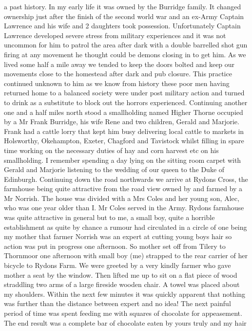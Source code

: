 a past history. In my early life it was owned by the Burridge family. It
changed ownership just after the finish of the second world war and an ex-Army
Captain Lawrence and his wife and 2 daughters took possession. Unfortunately
Captain Lawrence developed severe stress from military experiences and it was
not uncommon for him to patrol the area after dark with a double barrelled shot
gun firing at any movement he thought could be demons closing in to get him. As
we lived some half a mile away we tended to keep the doors bolted and keep our
movements close to the homestead after dark and pub closure. This practice
continued unknown to him as we know from history these poor men having returned
home to a balanced society were under post military action and turned to drink
as a substitute to block out the horrors experienced. Continuing another one
and a half miles north stood a smallholding named Higher Thorne occupied by a
Mr Frank Burridge, his wife Rene and two children, Gerald and Marjorie. Frank
had a cattle lorry that kept him busy delivering local cattle to markets in
Holsworthy, Okehampton, Exeter, Chagford and Tavistock whilst filling in spare
time working on the necessary duties of hay and corn harvest etc on his
smallholding. I remember spending a day lying on the sitting room carpet with
Gerald and Marjorie listening to the wedding of our queen to the Duke of
Edinburgh. Continuing down the road northwards we arrive at Rydons Cross, the
farmhouse being quite attractive from the road view owned by and farmed by a Mr
Norrish. The house was divided  with a Mrs Coles and her young son, Alec, who
was one year older than I. Mr Coles served in the Army. Rydons farmhouse was
quite attractive in general but to me, a small boy, quite a horrible
establishment as quite by chance a rumour had circulated in a circle of one
being my mother that farmer Norrish was an expert at cutting young boys hair so
action was put in progress one afternoon. So mother set off from Tilery to
Thornmoor one afternoon with small boy (me) strapped to the rear carrier of her
bicycle to Rydons Farm. We were greeted by a very kindly farmer  who gave
mother a seat by the window. Then lifted me up to sit on a flat piece of wood
straddling two arms of a large fireside wooden chair. A towel was placed about
my shoulders. Within the next few minutes it was quickly apparent that nothing
was further than the distance between expert and no idea! The next painful
period of time was spent feeding me with squares of chocolate for appeasement.
The end result was a complete bar of chocolate eaten by yours truly and my hair
